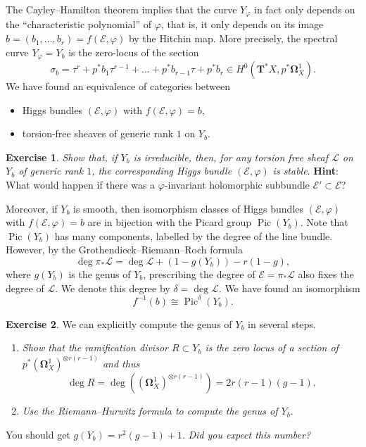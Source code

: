 \documentclass[12pt,a4paper]{amsbook}
\theoremstyle{remark} \newtheorem{rmk}[thm]{Remark}
\theoremstyle{definition} \newtheorem{defn}[thm]{Definition}
\theoremstyle{definition} \newtheorem{ex}[thm]{Example}
\theoremstyle{definition} \newtheorem{ej}{Exercise}
\newcommand{\sE}{\mathscr E}
\newcommand{\sL}{\mathscr L}
\DeclareMathOperator{\Pic}{Pic}
\begin{document}
The Cayley--Hamilton theorem implies that the curve $Y_\varphi$ in fact only depends on the ``characteristic polynomial'' of $\varphi$, that is, it only depends on its image $b=(b_1,\dots,b_r)=f(\sE,\varphi)$ by the Hitchin map. More precisely, the spectral curve $Y_\varphi=Y_b$ is the zero-locus of the section
\begin{equation*}
\sigma_b = \tau ^r + p^* b_1 \tau ^{r-1} + \dots + p^* b_{r-1} \tau + p^* b_r \in H^0(\bm{T}^* X,p^* \bm{\Omega}_X^1).
\end{equation*}
We have found an equivalence of categories between
\begin{itemize}
\item Higgs bundles $(\sE,\varphi)$ with $f(\sE,\varphi)=b$,
\item torsion-free sheaves of generic rank $1$ on $Y_b$.
\end{itemize}

\begin{ej}
\textit{Show that, if $Y_b$ is irreducible, then, for any torsion free sheaf $\sL$ on $Y_b$ of generic rank $1$, the corresponding Higgs bundle $(\sE,\varphi)$ is stable}. \textbf{Hint}: What would happen if there was a $\varphi$-invariant holomorphic subbundle $\sE'\subset \sE$?
\end{ej}

Moreover, if $Y_b$ is smooth, then isomorphism classes of Higgs bundles $(\sE,\varphi)$ with $f(\sE,\varphi)=b$ are in bijection with the Picard group $\Pic(Y_b)$.
Note that $\Pic(Y_b)$ has many components, labelled by the degree of the line bundle. However, by the Grothendieck--Riemann--Roch formula
\begin{equation*}
\deg \pi_* \sL = \deg \sL + (1-g(Y_b)) - r(1-g),
\end{equation*}
where $g(Y_b)$ is the genus of $Y_b$, prescribing the degree of $\sE=\pi_* \sL$ also fixes the degree of $\sL$. We denote this degree by $\delta=\deg \sL$. We have found an isomorphism
\begin{equation*}
f^{-1}(b) \cong \Pic^{\delta}(Y_b).
\end{equation*}

\begin{ej}
  We can explicitly compute the genus of $Y_b$ in several steps.
  \begin{enumerate}
    \item \textit{Show that the ramification divisor $R\subset Y_b$ is the zero locus of a section of $p^* (\bm{\Omega}^1_X)^{\otimes r(r-1)}$ and thus}
          \begin{equation*}
\deg R = \deg((\bm{\Omega}^1_X)^{\otimes r(r-1)}) = 2r(r-1)(g-1).
          \end{equation*}
    \item \textit{Use the Riemann--Hurwitz formula to compute the genus of $Y_b$}.
  \end{enumerate}
You should get $g(Y_b)=r^2(g-1)+1$. \textit{Did you expect this number?}
\end{ej}
\end{document}

